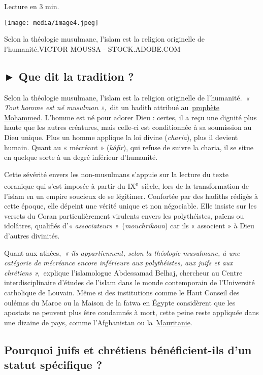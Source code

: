 Lecture en 3 min.

\texttt{[image: media/image4.jpeg]}

Selon la théologie musulmane, l'islam est la religion originelle de
l'humanité.VICTOR MOUSSA - STOCK.ADOBE.COM

\subsection{► Que dit la tradition ?}

Selon la théologie musulmane, l'islam est la religion originelle de
l'humanité.~\emph{« Tout homme est né musulman »,}~dit un hadith
attribué
au~\href{https://www.la-croix.com/sacralite-prophete-lislam-2020-11-06-1101123195}{\underline{prophète
Mohammed}}. L'homme est né pour adorer Dieu : certes, il a reçu une
dignité plus haute que les autres créatures, mais celle-ci est
conditionnée à sa soumission au Dieu unique. Plus un homme applique la
loi divine (\emph{charia}), plus il devient humain. Quant au « mécréant
» (\emph{kâfir}), qui refuse de suivre la charia, il se situe en quelque
sorte à un degré inférieur d'humanité.

Cette sévérité envers les non-musulmans s'appuie sur la lecture du texte
coranique qui s'est imposée à partir du IX\textsuperscript{e}~siècle,
lors de la transformation de l'islam en un empire soucieux de se
légitimer. Confortée par des hadiths rédigés à cette époque, elle
dépeint une vérité unique et non négociable. Elle insiste sur les
versets du Coran particulièrement virulents envers les polythéistes,
païens ou idolâtres, qualifiés d'\emph{« associateurs
»}~(\emph{mouchrikoun}) car ils « associent » à Dieu d'autres divinités.

Quant aux athées,~\emph{« ils appartiennent, selon la théologie
musulmane, à une catégorie de mécréance encore inférieure aux
polythéistes, aux juifs et aux chrétiens »,~}explique l'islamologue
Abdessamad Belhaj, chercheur au Centre interdisciplinaire d'études de
l'islam dans le monde contemporain de l'Université catholique de
Louvain. Même si des institutions comme le Haut Conseil des oulémas du
Maroc ou la Maison de la fatwa en Égypte considèrent que les apostats ne
peuvent plus être condamnés à mort, cette peine reste appliquée dans une
dizaine de pays, comme l'Afghanistan ou
la~\href{https://www.la-croix.com/Monde/Afrique/prisons-Mauritanie-calvaire-dun-apostat-2019-09-30-1201051050}{\underline{Mauritanie}}.

\subsection{ Pourquoi juifs et chrétiens bénéficient-ils d'un statut
spécifique ?}

